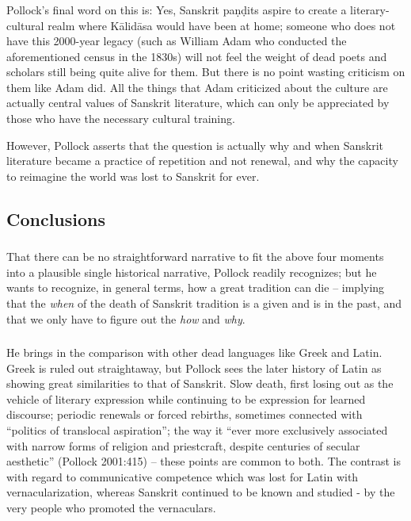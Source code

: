 \subsubsection{} Pollock’s final word on this is: Yes, Sanskrit paṇḍits aspire to create a literary-cultural realm where Kālidāsa would have been at home; someone who does not have this 2000-year legacy (such as William Adam who conducted the aforementioned census in the 1830s) will not feel the weight of dead poets and scholars still being quite alive for them. But there is no point wasting criticism on them like Adam did. All the things that Adam criticized about the culture are actually central values of Sanskrit literature, which can only be appreciated by those who have the necessary cultural training.

However, Pollock asserts that the question is actually why and when Sanskrit literature became a practice of repetition and not renewal, and why the capacity to reimagine the world was lost to Sanskrit for ever.

\subsection{Conclusions}
\vskip -5pt

\subsubsection{} That there can be no straightforward narrative to fit the above four moments into a plausible single historical narrative, Pollock readily recognizes; but he wants to recognize, in general terms, how a great tradition can die – implying that the {\sl when} of the death of Sanskrit tradition is a given and is in the past, and that we only have to figure out the {\sl how} and {\sl why}. 

\subsubsection{} He brings in the comparison with other dead languages like Greek and Latin. Greek is ruled out straightaway, but Pollock sees the later history of Latin as showing great similarities to that of Sanskrit. Slow death, first losing out as the vehicle of literary expression while continuing to be expression for learned discourse; periodic renewals or forced rebirths, sometimes connected with “politics of translocal aspiration”; the way it “ever more exclusively associated with narrow forms of religion and priestcraft, despite centuries of secular aesthetic” (Pollock 2001:415) – these points are common to both. The contrast is with regard to communicative competence which was lost for Latin with vernacularization, whereas Sanskrit continued to be known and studied - by the very people who promoted the vernaculars.

